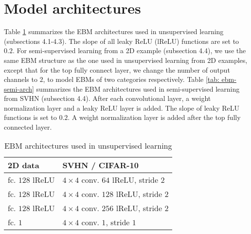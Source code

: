 \documentclass[10pt,twocolumn,letterpaper]{article}
\begin{document}
{\small


}
\newpage
\appendix
\section{Model architectures}	
Table \ref{tab: ebm-arch} summarizes the EBM architectures used in unsupervised learning (subsections 4.1-4.3). The slope of all leaky ReLU (lReLU) \cite{maas2013rectifier} functions are set to $0.2$. For semi-supervised learning from a 2D example (subsection 4.4), we use the same EBM structure as the one used in unsupervised learning from 2D examples, except that for the top fully connect layer, we change the number of output channels to $2$, to model EBMs of two categories respectively. Table \ref{tab: ebm-semi-arch} summarizes the EBM architectures used in semi-supervised learning from SVHN (subsection 4.4).  After each convolutional layer, a weight normalization \cite{salimans2016weight} layer and a leaky ReLU layer is added. The slope of leaky ReLU functions is set to $0.2$. A weight normalization layer is added after the top fully connected layer. 

\begin{table}[h]
	\centering
	\caption{EBM architectures used in unsupervised learning}
	\label{tab: ebm-arch}
	\begin{tabular}{ll}
		\toprule
		2D data & SVHN / CIFAR-10  \\
		\midrule 
		fc. $128$ lReLU & $4\times4$ conv. $64$ lReLU, stride $2$  \\
		fc. $128$ lReLU & $4\times4$ conv. $128$ lReLU, stride $2$\\
		fc. $128$ lReLU & $4\times4$ conv. $256$ lReLU, stride $2$\\
		fc. $1$ & $4 \times 4$ conv. $1$, stride $1$ \\
		\bottomrule
	\end{tabular}
\end{table}
\end{document}
